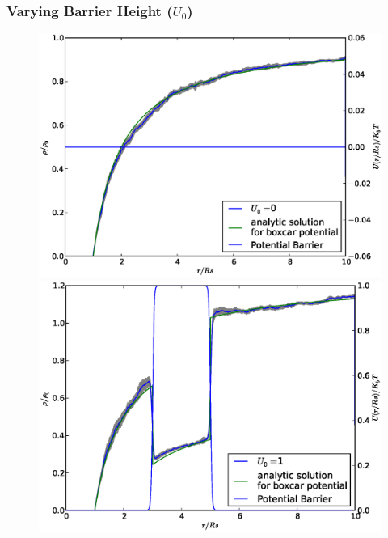 \subsubsection{Varying Barrier Height ($U_0$)}
\begin{figure}[H]
\centering
\begin{minipage}{.5 \textwidth}
    \centering
    \includegraphics[width=.95 \textwidth, keepaspectratio]{plots/cp/uo/Un0.eps}
\end{minipage}\begin{minipage}{.5 \textwidth}
    \includegraphics[width=.95 \textwidth, keepaspectratio]{plots/cp/uo/Un1.eps}
\end{minipage}
\begin{minipage}{.5 \textwidth}

\end{minipage}
\end{figure}
